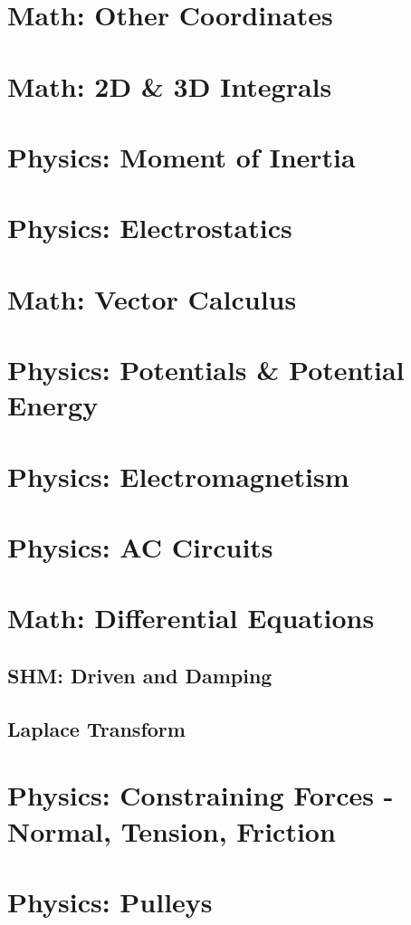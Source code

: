 \documentclass{article}
\begin{document}
\section{Math: Other Coordinates}
\section{Math: 2D \& 3D Integrals}
\section{Physics: Moment of Inertia}
\section{Physics: Electrostatics}

\section{Math: Vector Calculus}
\section{Physics: Potentials \& Potential Energy}
\section{Physics: Electromagnetism}
\section{Physics: AC Circuits}

\section{Math: Differential Equations}
\subsection{SHM: Driven and Damping}
\subsection{Laplace Transform}

\section{Physics: Constraining Forces - Normal, Tension, Friction}
\section{Physics: Pulleys}
\end{document}
